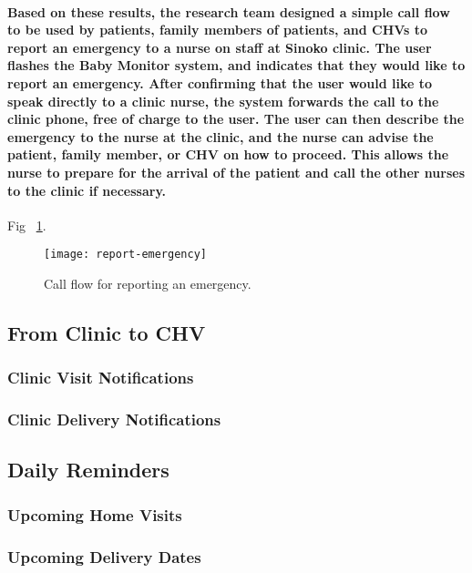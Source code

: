 \paragraph{Based on these results, the research team designed a simple call flow to be used by patients, family members of patients, and CHVs to report an emergency to a nurse on staff at Sinoko clinic. The user flashes the Baby Monitor system, and indicates that they would like to report an emergency. After confirming that the user would like to speak directly to a clinic nurse, the system forwards the call to the clinic phone, free of charge to the user. The user can then describe the emergency to the nurse at the clinic, and the nurse can advise the patient, family member, or CHV on how to proceed. This allows the nurse to prepare for the arrival of the patient and call the other nurses to the clinic if necessary.}

Fig ~\ref{fig:emergency}.
\begin{figure}[tbp]
	\begin{center}
	\texttt{[image: report-emergency]}
	\end{center}
	\caption{Call flow for reporting an emergency.}
	\label{fig:emergency}
\end{figure}

\subsection{From Clinic to CHV}
\subsubsection{Clinic Visit Notifications}

\subsubsection{Clinic Delivery Notifications}

\subsection{Daily Reminders}
\subsubsection{Upcoming Home Visits}

\subsubsection{Upcoming Delivery Dates}


